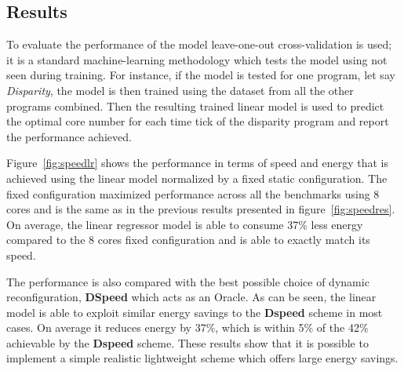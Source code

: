 \subsection{Results}

To evaluate the performance of the model leave-one-out cross-validation  is used; it is a standard machine-learning methodology which tests the model using not seen during training.
For instance, if the model is tested for one program, let say \textit{Disparity}, the model is then trained using the dataset from all the other programs combined.
Then the resulting trained linear model is used to predict the optimal core number for each time tick of the disparity program and report the performance achieved.

Figure~\ref{fig:speedlr} shows the performance in terms of speed and energy that is achieved using the linear model normalized by a fixed static configuration.
The fixed configuration maximized performance across all the benchmarks using 8 cores and is the same as in the previous results presented in figure~\ref{fig:speedres}.
On average, the linear regressor model is able to consume 37\% less energy compared to the 8 cores fixed configuration and is able to exactly match its speed.

The performance is also compared with the best possible choice of dynamic reconfiguration, \textbf{DSpeed} which acts as an Oracle.
As can be seen, the linear model is able to exploit similar energy savings to the \textbf{Dspeed} scheme in most cases.
On average it reduces energy by 37\%, which is within 5\% of the 42\% achievable by the \textbf{Dspeed} scheme.
These results show that it is possible to implement a simple realistic lightweight scheme which offers large energy savings.
